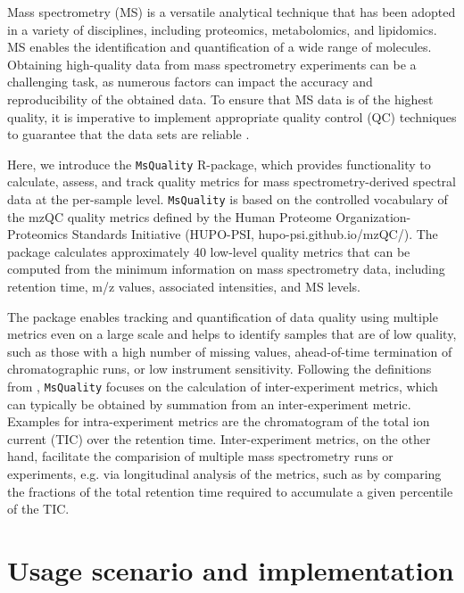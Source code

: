 \documentclass{bioinfo}
\begin{document}
\maketitle

Mass spectrometry (MS) is a versatile analytical technique that has been 
adopted in a variety of disciplines, including proteomics, metabolomics, and 
lipidomics. MS enables the identification and quantification of a wide range 
of molecules. Obtaining high-quality data from mass spectrometry experiments 
can be a challenging task, as numerous factors can impact the accuracy and 
reproducibility of the obtained data. To ensure that MS data is of the 
highest quality, it is imperative to implement appropriate quality control 
(QC) techniques to guarantee that the data sets are reliable 
\citep{Koecher2011}.

Here, we introduce the \texttt{MsQuality} R-package, which provides 
functionality to calculate, assess, and track quality metrics for mass 
spectrometry-derived spectral data at the per-sample level. 
\texttt{MsQuality} is based on the controlled vocabulary of the mzQC quality 
metrics defined by the Human Proteome Organization-Proteomics Standards 
Initiative (HUPO-PSI, hupo-psi.github.io/mzQC/). The package calculates
approximately 40 low-level 
quality metrics that can be computed from the minimum information on mass 
spectrometry data, including retention time, m/z values, associated intensities, 
and MS levels.

The package enables tracking and quantification of data quality using 
multiple metrics even on a large scale and helps to identify samples that 
are of low quality, such as those with a high number of missing values, 
ahead-of-time termination of chromatographic runs, or low instrument sensitivity. 
Following the definitions from \cite{Bittremieux2017}, \texttt{MsQuality}
focuses on the calculation of inter-experiment metrics, which can typically be 
obtained by summation from an inter-experiment metric. Examples for
intra-experiment metrics are the chromatogram of the total ion current (TIC) 
over the retention time. Inter-experiment metrics, on the other hand, 
facilitate the comparision of multiple mass spectrometry runs or experiments, 
e.g. via longitudinal analysis of the metrics, such as by comparing the
fractions of the total retention time required to accumulate a given
percentile of the TIC.

\section{Usage scenario and implementation} \label{usagescenario}
\end{document}
